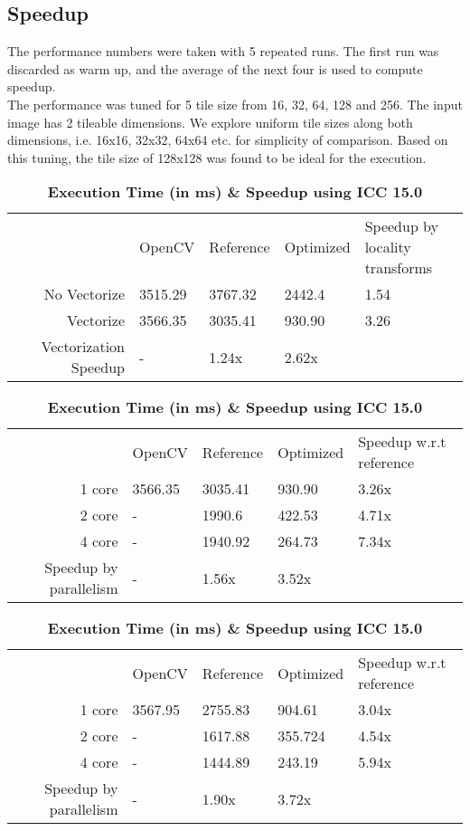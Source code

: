 \documentclass[]{article}
\begin{document}
\subsection{Speedup}
The performance numbers were taken with 5 repeated runs. The first run was discarded as warm up, and the average of the next four is used to compute speedup.\\
The performance was tuned for 5 tile size from 16, 32, 64, 128 and 256. The input image has 2 tileable dimensions. We explore uniform tile sizes along both dimensions, i.e. 16x16, 32x32, 64x64 etc. for simplicity of comparison. Based on this tuning, the tile size of 128x128 was found to be ideal for the execution.

\begin{table}[h!]
\begin{center}
\caption{\textbf{Single Core Execution Time (in ms) \& Speedup -Vectorization} }
\begin{tabular}{r|l|l|l|l}
& OpenCV & Reference & Optimized & \pbox{20cm}{Speedup by \\ locality transforms} \\
No Vectorize & 3515.29 & 3767.32 & 2442.4 & 1.54 \\
Vectorize & 3566.35 & 3035.41 & 930.90 & 3.26 \\
Vectorization Speedup & - & 1.24x & 2.62x & \\
\end{tabular}
\end{center}
\caption{\textbf{Execution Time (in ms) \& Speedup using GCC 4.9} }
\begin{center}
\begin{tabular}{r|l|l|l|l}
& OpenCV & Reference & Optimized & Speedup w.r.t reference\\
1 core & 3566.35 & 3035.41 & 930.90 & 3.26x \\
2 core & - & 1990.6 & 422.53 & 4.71x \\
4 core & - & 1940.92 & 264.73 & 7.34x \\
Speedup by parallelism & - & 1.56x & 3.52x & \\
\end{tabular}
\end{center}
\caption{\textbf{Execution Time (in ms) \& Speedup using ICC 15.0}}
\begin{center}
\begin{tabular}{r|l|l|l|l}
& OpenCV & Reference & Optimized & Speedup w.r.t reference\\
1 core & 3567.95 & 2755.83 & 904.61 & 3.04x \\
2 core & - & 1617.88 & 355.724 & 4.54x \\
4 core & - & 1444.89 & 243.19 & 5.94x \\
Speedup by parallelism & - & 1.90x & 3.72x & \\
\end{tabular}
\end{center}
\end{table}
\end{document}
